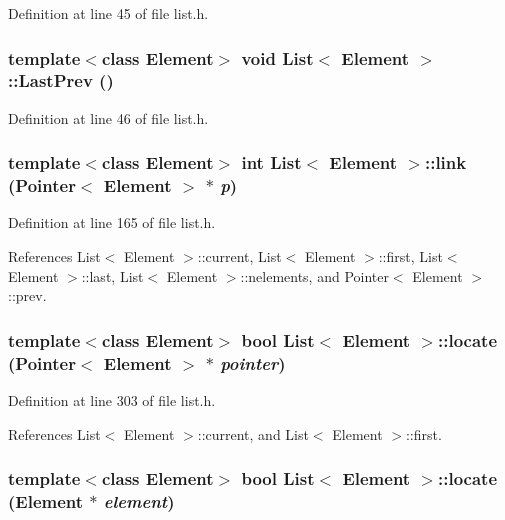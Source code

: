Definition at line 45 of file list.h.\hypertarget{classList_bcd5880a9c91c1007a7f977aee2bee12}{
\subsubsection[{LastPrev}]{\setlength{\rightskip}{0pt plus 5cm}template$<$class Element$>$ void {\bf List}$<$ Element $>$::LastPrev ()}}
\label{classList_bcd5880a9c91c1007a7f977aee2bee12}




Definition at line 46 of file list.h.\hypertarget{classList_d2d9499975ef0a258d56a9167f589a32}{
\subsubsection[{link}]{\setlength{\rightskip}{0pt plus 5cm}template$<$class Element$>$ int {\bf List}$<$ Element $>$::link ({\bf Pointer}$<$ Element $>$ $\ast$ {\em p})}}
\label{classList_d2d9499975ef0a258d56a9167f589a32}




Definition at line 165 of file list.h.

References List$<$ Element $>$::current, List$<$ Element $>$::first, List$<$ Element $>$::last, List$<$ Element $>$::nelements, and Pointer$<$ Element $>$::prev.\hypertarget{classList_b065dc615002ea349deaa40f356b6ba9}{
\subsubsection[{locate}]{\setlength{\rightskip}{0pt plus 5cm}template$<$class Element$>$ bool {\bf List}$<$ Element $>$::locate ({\bf Pointer}$<$ Element $>$ $\ast$ {\em pointer})}}
\label{classList_b065dc615002ea349deaa40f356b6ba9}




Definition at line 303 of file list.h.

References List$<$ Element $>$::current, and List$<$ Element $>$::first.\hypertarget{classList_8d5c272adc1ff7f4dfa91a973bed46aa}{
\subsubsection[{locate}]{\setlength{\rightskip}{0pt plus 5cm}template$<$class Element$>$ bool {\bf List}$<$ Element $>$::locate (Element $\ast$ {\em element})}}
\label{classList_8d5c272adc1ff7f4dfa91a973bed46aa}




